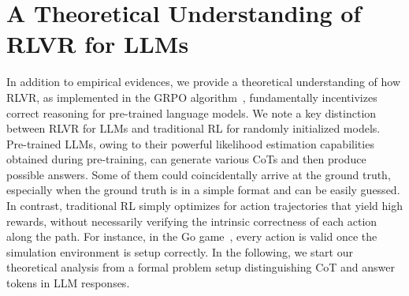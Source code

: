 \section{A Theoretical Understanding of RLVR for LLMs}
\label{sec:theory}

In addition to empirical evidences, we provide a theoretical understanding of how RLVR, as implemented in the GRPO algorithm~\citep{shao2024deepseekmath}, fundamentally incentivizes correct reasoning for pre-trained language models. We note a key distinction between RLVR for LLMs and traditional RL for randomly initialized models. Pre-trained LLMs, owing to their powerful likelihood estimation capabilities obtained during pre-training, can generate various CoTs and then produce possible answers. Some of them could coincidentally arrive at the ground truth, especially when the ground truth is in a simple format and can be easily guessed. In contrast, traditional RL simply optimizes for action trajectories that yield high rewards, without necessarily verifying the intrinsic correctness of each action along the path. For instance, in the Go game~\citep{silver2017AlphaGo}, every action is valid once the simulation environment is setup correctly. In the following, we start our theoretical analysis from a formal problem setup distinguishing CoT and answer tokens in LLM responses.



